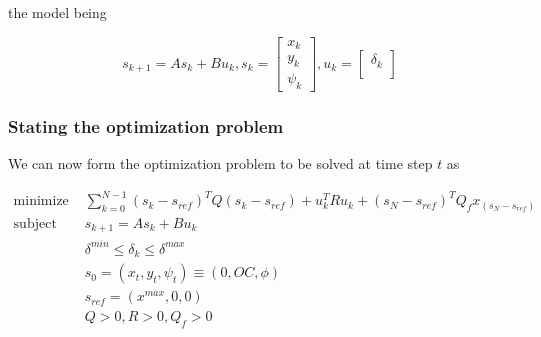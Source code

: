 the model being

\begin{equation}
  s_{k+1} = A s_k + B u_k,
  s_k=
  \begin{bmatrix}
    x_{k} \\
    y_{k} \\
    \psi_{k}
  \end{bmatrix},
  u_k=
  \begin{bmatrix}
    \delta_{k}\\
  \end{bmatrix}
\end{equation}



\subsubsection{Stating the optimization problem}

We can now form the optimization problem to be solved at time step $t$ as

\begin{align}
  \text{minimize }    & \sum\limits_{k=0}^{N-1} (s_k - s_{ref})^T Q (s_k - s_{ref}) + u_k^T R u_k + (s_N-s_{ref})^T Q_f x_(s_N-s_{ref}) \\
  \text{subject to }  & s_{k+1} = A s_k + B u_k \\
                      & \delta^{min} \leq \delta_k \leq \delta^{max} \\
                      & s_0 = (x_t, y_t, \psi_t) \equiv (0, OC, \phi)\\
                      & s_{ref} = (x^{max}, 0, 0)\\
                      & Q > 0, R > 0, Q_f > 0
\end{align}
